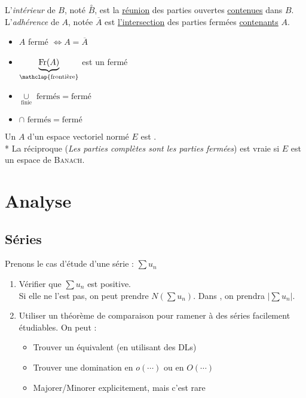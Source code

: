 \documentclass[11pt,a4paper,fleqn,pdftex]{report}
\begin{document}
\begin{dfn}
L'\emph{intérieur} de $B$, noté $\overset{\circ}{B}$, est la \uline{réunion} des parties ouvertes \uline{contenues} dans $B$. \newline
L'\emph{adhérence} de $A$, notée $\overline{A}$ est \uline{l'intersection} des parties fermées \uline{contenants} $A$.
\end{dfn}

\begin{prop}
\begin{itemize}
\item $A$ fermé $\Leftrightarrow A=\overline{A}$
\item $\underbrace{\mathrm{Fr}(A)}_{\mathclap{\text{frontière}}}$ est un fermé
\item $\underset{\text{finie}}{\cup} \text{ fermés} = \text{fermé}$
\item $\cap \text{ fermés} = \text{fermé}$
\end{itemize}
\end{prop}

\begin{itheorem}
    Un  $A$ d'un espace vectoriel normé $E$ est .\\*
    La réciproque (\textit{Les parties complètes sont les parties fermées}) est vraie si $E$ est un espace de \textsc{Banach}.
\end{itheorem}
\part{Analyse}
\chapter{Séries} %
\label{cha:series}
\begin{methode}
Prenons le cas d'étude d'une série : $ \sum u_n$
\begin{enumerate}
    \item Vérifier que $\sum u_n$ est positive. \\ Si elle ne l'est pas, on peut prendre $N(\sum u_n)$. Dans \Reel{}, on prendra $\left| \sum u_n \right|$.
    \item Utiliser un théorème de comparaison pour ramener à des séries facilement étudiables. On peut : 
    \begin{itemize}
        \item Trouver un équivalent (en utilisant des \glspl{DL})
        \item Trouver une domination en $o(\cdots)$ ou en $O(\cdots)$
        \item Majorer/Minorer explicitement, mais c'est rare
    \end{itemize}
\end{enumerate}
\end{methode}
\end{document}

